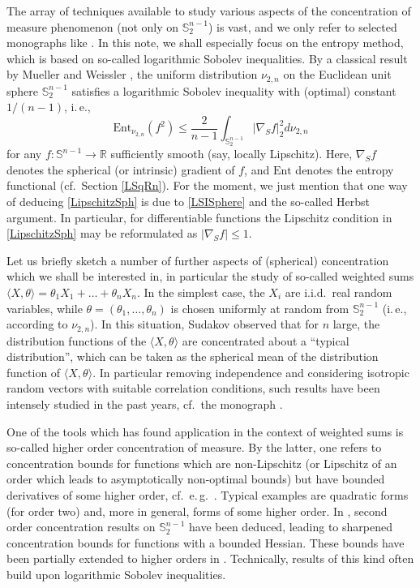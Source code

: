 \documentclass[a4paper,12pt]{amsart}
\numberwithin{equation}{section}
\theoremstyle{remark}
\def\R{{\mathbb R}}
\def\S{{\mathbb S}}
\begin{document}
The array of techniques available to study various aspects of the concentration of measure phenomenon (not only on $\S_2^{n-1}$) is vast, and we only refer to selected monographs like \cite{Led01,BLM13,BCG23}. In this note, we shall especially focus on the entropy method, which is based on so-called logarithmic Sobolev inequalities. By a classical result by Mueller and Weissler \cite{MW82}, the uniform distribution $\nu_{2,n}$ on the Euclidean unit sphere $\S_2^{n-1}$ satisfies a logarithmic Sobolev inequality with (optimal) constant $1/(n-1)$, i.\,e.,
\begin{equation}\label{LSISphere}
\mathrm{Ent}_{\nu_{2,n}} (f^2) \le \frac{2}{n-1} \int_{\S_2^{n-1}} \lvert \nabla_S f \rvert_2^2 d\nu_{2,n}
\end{equation}
for any $f \colon \S^{n-1} \to \R$ sufficiently smooth (say, locally Lipschitz). Here, $\nabla_S f$ denotes the spherical (or intrinsic) gradient of $f$, and $\mathrm{Ent}$ denotes the entropy functional (cf.\ Section \ref{LSqRn}). For the moment, we just mention that one way of deducing \eqref{LipschitzSph} is due to \eqref{LSISphere} and the so-called Herbst argument. In particular, for differentiable functions the Lipschitz condition in \eqref{LipschitzSph} may be reformulated as $|\nabla_S f| \le 1$.

Let us briefly sketch a number of further aspects of (spherical) concentration which we shall be interested in, in particular the study of so-called weighted sums $\langle X, \theta \rangle = \theta_1 X_1 + \ldots + \theta_n X_n$. In the simplest case, the $X_i$ are i.i.d.\ real random variables, while $\theta = (\theta_1, \ldots, \theta_n)$ is chosen uniformly at random from $\S_2^{n-1}$ (i.\,e., according to $\nu_{2,n}$). In this situation, Sudakov \cite{Sud78} observed that for $n$ large, the distribution functions of the $\langle X, \theta \rangle$ are concentrated about a ``typical distribution'', which can be taken as the spherical mean of the distribution function of $\langle X, \theta \rangle$. In particular removing independence and considering isotropic random vectors with suitable correlation conditions, such results have been intensely studied in the past years, cf.\ the monograph \cite{BCG23}.

One of the tools which has found application in the context of weighted sums is so-called higher order concentration of measure. By the latter, one refers to concentration bounds for functions which are non-Lipschitz (or Lipschitz of an order which leads to asymptotically non-optimal bounds) but have bounded derivatives of some higher order, cf.\ e.\,g.\ \cite{AW15}. Typical examples are quadratic forms (for order two) and, more in general, forms of some higher order. In \cite{BCG17}, second order concentration results on $\S_2^{n-1}$ have been deduced, leading to sharpened concentration bounds for functions with a bounded Hessian. These bounds have been partially extended to higher orders in \cite{BGS19}. Technically, results of this kind often build upon logarithmic Sobolev inequalities.
\end{document}
